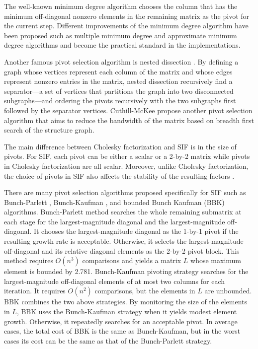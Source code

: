 \documentclass{article}
\begin{document}
The well-known minimum degree algorithm \cite{MD1} chooses the column that has the minimum off-diagonal nonzero elements in the remaining matrix as the pivot for the current step.  
Different improvements of the minimum degree algorithm have been proposed \cite{MDevol} such as multiple minimum degree \cite{MMD1} and approximate minimum degree algorithms \cite{AMD1} and become the practical standard in the implementations.

Another famous pivot selection algorithm is nested dissection \cite{ND}.  By defining a graph whose vertices represent each column of the matrix and whose edges represent nonzero entries in the matrix, nested dissection recursively find a separator---a set of vertices that partitions the graph into two disconnected subgraphs---and ordering the pivots recursively with the two subgraphs first followed by the separator vertices.  Cuthill-McKee \cite{CM} propose another pivot selection algorithm that aims to reduce the bandwidth of the matrix based on breadth first search of the  structure graph.

The main difference between Cholesky factorization and SIF is in the size of pivots.  For SIF, each pivot can be either a scalar or a 2-by-2 matrix while pivots in Cholesky factorization are all scalar.
Moreover, unlike Cholesky factorization, the choice of pivots in SIF also affects the stability of the resulting factors \cite{SIF1}.

There are many pivot selection algorithms proposed specifically for SIF such as 
Bunch-Parlett \cite{BP}, Bunch-Kaufman \cite{BK}, and bounded Bunch Kaufman (BBK) \cite{BBK} algorithms.
Bunch-Parlett method searches the whole remaining submatrix at each stage for the largest-magnitude diagonal and the largest-magnitude off-diagonal.  It chooses the largest-magnitude diagonal as the 1-by-1 pivot if the resulting growth rate is acceptable.  Otherwise, it selects the largest-magnitude off-diagonal and its relative diagonal elements as the 2-by-2 pivot block. 
This method requires $O(n^3)$ comparisons and yields a matrix  $L$ whose maximum element is bounded by 2.781.
Bunch-Kaufman pivoting strategy searches for the largest-magnitude off-diagonal elements of at most two columns for each iteration. It requires $O(n^2)$ comparisons, but the elements in $L$ are unbounded. 
BBK combines the two above strategies.  By monitoring the size of the elements in $L$, BBK uses the Bunch-Kaufman strategy when it yields modest element growth. Otherwise, it repeatedly searches for an acceptable pivot.
In average cases, the total cost of BBK is the same as Bunch-Kaufman, but in the worst cases its cost can be the same as that of the Bunch-Parlett strategy.  
\end{document}
